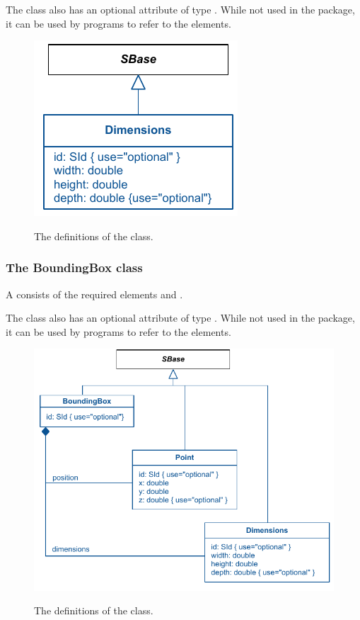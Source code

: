 The \Dimensions class also has an optional attribute  of type 
. While not used in the \Layout package, it can be used 
by programs to refer to the elements. 


\begin{figure}[!ht]
\includegraphics{uml/layout-dimensions-uml}\\
\label{uml:dimensions}
\caption{The definitions of the \Dimensions class.}
\end{figure}
 \subsubsection{The BoundingBox class} \label{boundingbox-class} A 
\BoundingBox consists of the required elements  and . 

The \BoundingBox class also has an optional attribute  of type 
. While not used in the \Layout package, it can be used 
by programs to refer to the elements. 

\begin{figure}[!ht]
\includegraphics{uml/layout-boundingbox-uml}\\
\label{uml:boundingbox}
\caption{The definitions of the \BoundingBox class.}
\end{figure}

